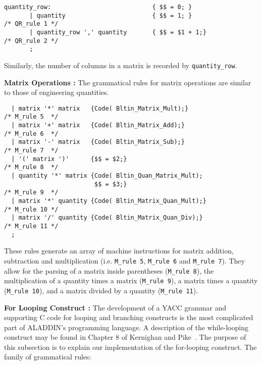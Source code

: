 \begin{footnotesize}
\begin{verbatim}
quantity_row:                            { $$ = 0; }              
       | quantity                        { $$ = 1; }                  /* QR_rule 1 */
       | quantity_row ',' quantity       { $$ = $1 + 1;}              /* QR_rule 2 */
       ;
\end{verbatim}
\end{footnotesize}

\vspace{0.05 in}\noindent
Similarly, the number of columns in a matrix is recorded by {\tt quantity\_row}.

\vspace{0.15 in}\noindent
{\bf Matrix Operations :} The grammatical rules for matrix operations
are similar to those of engineering quantities.

\begin{footnotesize}
\begin{verbatim}
  | matrix '*' matrix   {Code( Bltin_Matrix_Mult);}                   /* M_rule 5  */
  | matrix '+' matrix   {Code( Bltin_Matrix_Add);}                    /* M_rule 6  */
  | matrix '-' matrix   {Code( Bltin_Matrix_Sub);}                    /* M_rule 7  */
  | '(' matrix ')'      {$$ = $2;}                                    /* M_rule 8  */
  | quantity '*' matrix {Code( Bltin_Quan_Matrix_Mult);
                         $$ = $3;}                                    /* M_rule 9  */
  | matrix '*' quantity {Code( Bltin_Matrix_Quan_Mult);}              /* M_rule 10 */
  | matrix '/' quantity {Code( Bltin_Matrix_Quan_Div);}               /* M_rule 11 */
  ;
\end{verbatim}
\end{footnotesize}

\vspace{0.05 in}\noindent
These rules generate an array of machine instructions for 
matrix addition, subtraction and
multiplication (i.e. {\tt M\_rule 5}, {\tt M\_rule 6} and {\tt M\_rule 7}).
They allow for the parsing of a matrix inside parentheses ({\tt M\_rule 8}),
the multiplication of a quantity times a matrix ({\tt M\_rule 9}),
a matrix times a quantity ({\tt M\_rule 10}),
and a matrix divided by a quantity ({\tt M\_rule 11}).
 
\vspace{0.15 in}\noindent
{\bf For Looping Construct :} The development of a YACC grammar and 
supporting C code for looping and branching constructs is the most
complicated part of ALADDIN's programming language. A description
of the while-looping construct may be found in Chapter 8 of
Kernighan and Pike~\cite{kernighan-pike}. The purpose of this
subsection is to explain our implementation of the for-looping construct.
The family of grammatical rules:

